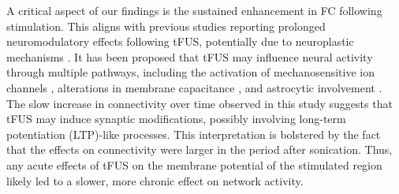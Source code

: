 \documentclass[conference]{ieeeconf}
\begin{document}
A critical aspect of our findings is the sustained enhancement in FC following stimulation. This aligns with previous studies \cite{Verhagen2019-ae,zhang2023excitatory,yaakub2023transcranial} reporting prolonged neuromodulatory effects following tFUS, potentially due to neuroplastic mechanisms \cite{bault2024early}. It has been proposed that tFUS may influence neural activity through multiple pathways, including the activation of mechanosensitive ion channels \cite{kubanek2016ultrasound}, alterations in membrane capacitance \cite{krasovitski2011intramembrane}, and astrocytic involvement \cite{yang2015enhancement}. The slow increase in connectivity over time observed in this study suggests that tFUS may induce synaptic modifications, possibly involving long-term potentiation (LTP)-like processes. This interpretation is bolstered by the fact that the effects on connectivity were larger in the period after sonication. Thus, any acute effects of tFUS on the membrane potential of the stimulated region likely led to a slower, more chronic effect on network activity. 






\end{document}
